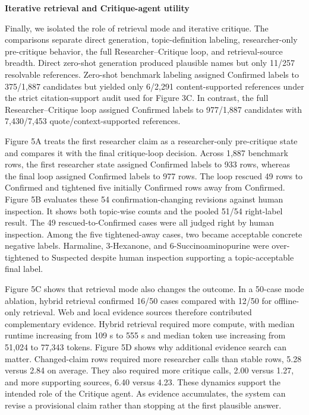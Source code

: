 \documentclass[
]{article}
\begin{document}
\textbf{Iterative retrieval and Critique-agent utility}

Finally, we isolated the role of retrieval mode and iterative critique.
The comparisons separate direct generation, topic-definition labeling,
researcher-only pre-critique behavior, the full Researcher--Critique
loop, and retrieval-source breadth. Direct zero-shot generation produced
plausible names but only 11/257 resolvable references. Zero-shot
benchmark labeling assigned Confirmed labels to 375/1,887 candidates but
yielded only 6/2,291 content-supported references under the strict
citation-support audit used for Figure 3C. In contrast, the full
Researcher--Critique loop assigned Confirmed labels to 977/1,887
candidates with 7,430/7,453 quote/context-supported references.

Figure 5A treats the first researcher claim as a researcher-only
pre-critique state and compares it with the final critique-loop decision.
Across 1,887 benchmark rows, the first researcher state assigned
Confirmed labels to 933 rows, whereas the final loop assigned Confirmed
labels to 977 rows. The loop rescued 49 rows to Confirmed and tightened
five initially Confirmed rows away from Confirmed. Figure 5B evaluates
these 54 confirmation-changing revisions against human inspection. It
shows both topic-wise counts and the pooled 51/54 right-label result.
The 49 rescued-to-Confirmed cases were all judged right by human
inspection. Among the five tightened-away cases, two became acceptable
concrete negative labels. Harmaline, 3-Hexanone, and
6-Succinoaminopurine were over-tightened to Suspected despite human
inspection supporting a topic-acceptable final label.

Figure 5C shows that retrieval mode also changes the outcome. In a
50-case mode ablation, hybrid retrieval confirmed 16/50 cases compared
with 12/50 for offline-only retrieval. Web and local evidence sources
therefore contributed complementary evidence. Hybrid retrieval required
more compute, with median runtime increasing from 109 s to 555 s and
median token use increasing from 51,024 to 77,343 tokens. Figure 5D shows
why additional evidence search can matter. Changed-claim rows required
more researcher calls than stable rows, 5.28 versus 2.84 on average.
They also required more critique calls, 2.00 versus 1.27, and more
supporting sources, 6.40 versus 4.23. These dynamics support the
intended role of the Critique agent. As evidence accumulates, the system
can revise a
provisional claim rather than stopping at the first plausible answer.
\end{document}

